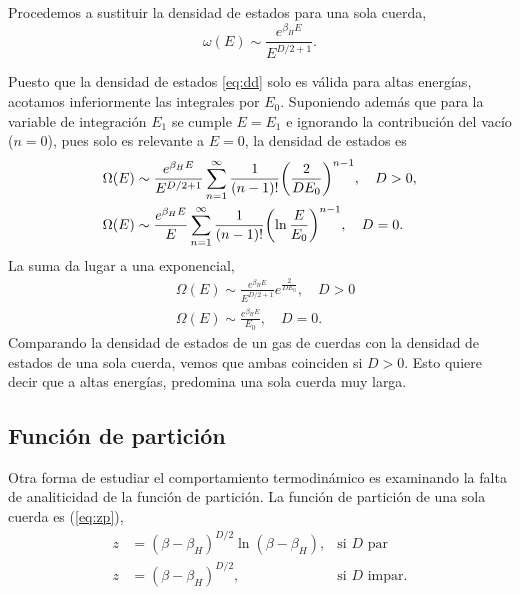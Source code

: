 Procedemos a sustituir la densidad de estados para una sola cuerda,
\begin{equation}
  \omega(E)\sim \frac{e^{\beta_H E}}{E^{D/2+1}}.
  \label{eq:dd}
\end{equation}

Puesto que la densidad de estados \ref{eq:dd} solo es válida para altas energías, acotamos inferiormente
las integrales por $E_0$.
Suponiendo además que para la variable de integración $E_1$ se cumple $E=E_1$ e ignorando
la contribución del vacío ($n=0$), pues solo es relevante a $E=0$, la densidad de estados es
\begin{equation}
  \begin{aligned}
    &\Omega(E) \sim \frac{e^{\beta_H E}}{E^{D/2+1}} \sum_{n=1}^\infty \frac{1}{(n-1)!}\qty(\frac{2}{DE_0})^{n-1},\quad D>0,\\
    &\Omega(E) \sim \frac{e^{\beta_H E}}{E} \sum_{n=1}^\infty \frac{1}{(n-1)!}\qty(\ln \frac{E}{E_0})^{n-1},\quad D=0.\\
  \end{aligned}
\end{equation}
La suma da lugar a una exponencial,
\begin{equation}
  \begin{aligned}
    &\Omega(E) \sim \frac{e^{\beta_H E}}{E^{D/2+1}}e^{\frac{2}{DE_0}}, \quad D>0\\
    &\Omega(E) \sim \frac{e^{\beta_H E}}{E_0}, \quad D=0.
  \end{aligned}
\end{equation}
Comparando la densidad de estados de un gas de cuerdas con la densidad de estados de una sola cuerda, vemos que 
ambas coinciden si $D>0$.
Esto quiere decir que a altas energías, predomina una sola cuerda muy larga.

\subsection{Función de partición}

Otra forma de estudiar el comportamiento termodinámico es examinando la falta de analiticidad de la función de partición.
La función de partición de una sola cuerda es (\ref{eq:zp}),
\begin{equation}
  \begin{aligned}
    z&=(\beta-\beta_H)^{D/2}\ln(\beta-\beta_H), &\text{si $D$ par}\\
    z&=(\beta-\beta_H)^{D/2}, &\text{si $D$ impar}.
  \end{aligned}
\end{equation}


